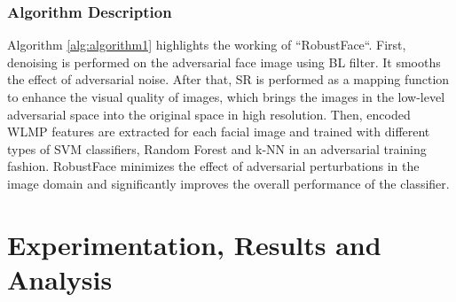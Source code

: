 \documentclass[sn-mathphys]{sn-jnl}%
\theoremstyle{thmstyleone}%
\theoremstyle{thmstyletwo}%
\theoremstyle{thmstylethree}%
\begin{document}



\subsubsection{Algorithm Description}
Algorithm \ref{alg:algorithm1} highlights the working of ``RobustFace``.  First, denoising is performed on the adversarial face image using BL filter. It smooths the effect of adversarial noise. After that, SR is performed as a mapping function to enhance the visual quality of images, which brings the images in the low-level adversarial space into the original space in high resolution. Then, encoded WLMP features are extracted for each facial image and trained with different types of SVM classifiers, Random Forest and k-NN in an adversarial training fashion. RobustFace minimizes the effect of adversarial perturbations in the image domain and significantly improves the overall performance of the classifier.

\section{Experimentation, Results and Analysis} 
\end{document}
